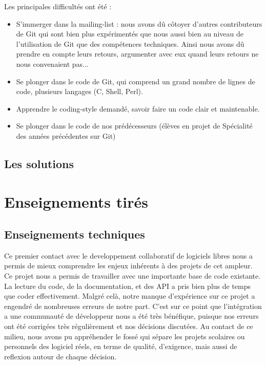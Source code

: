 \documentclass[a4paper, 12pt]{article}
\begin{document}
Les principales difficultés ont été :
\begin{itemize}

\item S'immerger dans la mailing-list : nous avons dû côtoyer d'autres contributeurs de Git qui sont bien plus expérimentés que nous aussi bien au niveau de l'utilisation de Git que des compétences techniques. Ainsi nous avons dû prendre en compte leurs retours, argumenter avec eux quand leurs retours ne nous convenaient pas...
\item Se plonger dans le code de Git, qui comprend un grand nombre de lignes de code, plusieurs langages (C, Shell, Perl).
\item Apprendre le coding-style demandé, savoir faire un code clair et maintenable.
\item Se plonger dans le code de nos prédécesseurs (élèves en projet de Spécialité des années précédentes sur Git)

\end{itemize}

\subsection{Les solutions}





\section{Enseignements tirés}

\subsection{Enseignements techniques}

Ce premier contact avec le developpement collaboratif de logiciels libres nous a permis de mieux comprendre les enjeux inhérents à des projets de cet ampleur. 
Ce projet nous a permis de travailler avec une importante base de code existante. La lecture du code, de la documentation, et des API a pris bien plus de temps que coder effectivement. Malgré celà, notre manque d'expérience sur ce projet a engendré de nombreuses erreurs de notre part.
C'est sur ce point que l'intégration a une communauté de développeur nous a été très bénéfique, puisque nos erreurs ont été corrigées très régulièrement et nos décisions discutées.
Au contact de ce milieu, nous avons pu appréhender le fossé qui sépare les projets scolaires ou personnels des logiciel réels, en terme de qualité, d'exigence, mais aussi de reflexion autour de chaque décision.
\end{document}

